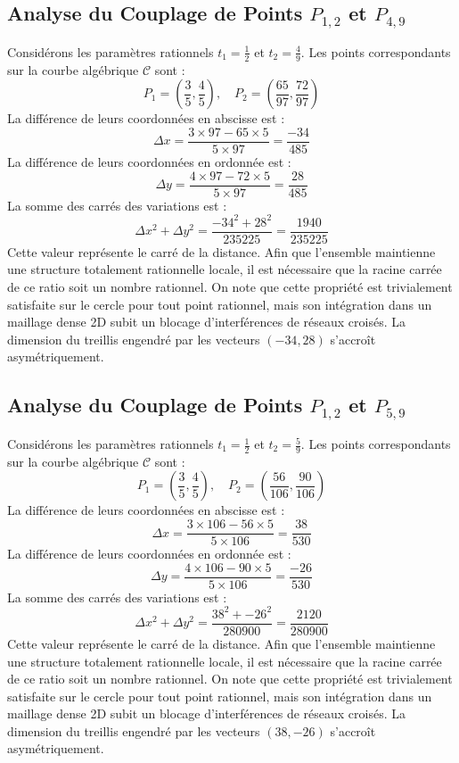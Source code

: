 \documentclass[12pt, a4paper]{article}
\begin{document}
\subsection{Analyse du Couplage de Points $P_{1,2}$ et $P_{4,9}$}
Considérons les paramètres rationnels $t_1 = \frac{1}{2}$ et $t_2 = \frac{4}{9}$.
Les points correspondants sur la courbe algébrique $\mathcal{C}$ sont :
$$ P_1 = \left( \frac{3}{5}, \frac{4}{5} \right), \quad P_2 = \left( \frac{65}{97}, \frac{72}{97} \right) $$
La différence de leurs coordonnées en abscisse est :
$$ \Delta x = \frac{3 \times 97 - 65 \times 5}{5 \times 97} = \frac{-34}{485} $$
La différence de leurs coordonnées en ordonnée est :
$$ \Delta y = \frac{4 \times 97 - 72 \times 5}{5 \times 97} = \frac{28}{485} $$
La somme des carrés des variations est :
$$ \Delta x^2 + \Delta y^2 = \frac{ -34^2 + 28^2 }{ 235225 } = \frac{ 1940 }{ 235225 } $$
Cette valeur représente le carré de la distance. Afin que l'ensemble maintienne une structure totalement rationnelle locale, il est nécessaire que la racine carrée de ce ratio soit un nombre rationnel. On note que cette propriété est trivialement satisfaite sur le cercle pour tout point rationnel, mais son intégration dans un maillage dense 2D subit un blocage d'interférences de réseaux croisés. La dimension du treillis engendré par les vecteurs $( -34, 28 )$ s'accroît asymétriquement.


\subsection{Analyse du Couplage de Points $P_{1,2}$ et $P_{5,9}$}
Considérons les paramètres rationnels $t_1 = \frac{1}{2}$ et $t_2 = \frac{5}{9}$.
Les points correspondants sur la courbe algébrique $\mathcal{C}$ sont :
$$ P_1 = \left( \frac{3}{5}, \frac{4}{5} \right), \quad P_2 = \left( \frac{56}{106}, \frac{90}{106} \right) $$
La différence de leurs coordonnées en abscisse est :
$$ \Delta x = \frac{3 \times 106 - 56 \times 5}{5 \times 106} = \frac{38}{530} $$
La différence de leurs coordonnées en ordonnée est :
$$ \Delta y = \frac{4 \times 106 - 90 \times 5}{5 \times 106} = \frac{-26}{530} $$
La somme des carrés des variations est :
$$ \Delta x^2 + \Delta y^2 = \frac{ 38^2 + -26^2 }{ 280900 } = \frac{ 2120 }{ 280900 } $$
Cette valeur représente le carré de la distance. Afin que l'ensemble maintienne une structure totalement rationnelle locale, il est nécessaire que la racine carrée de ce ratio soit un nombre rationnel. On note que cette propriété est trivialement satisfaite sur le cercle pour tout point rationnel, mais son intégration dans un maillage dense 2D subit un blocage d'interférences de réseaux croisés. La dimension du treillis engendré par les vecteurs $( 38, -26 )$ s'accroît asymétriquement.
\end{document}
